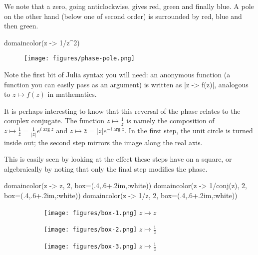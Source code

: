 \documentclass[a4paper]{article}
\begin{document}
We note that a zero, going anticlockwise, gives red, green and finally blue. A
pole on the other hand (below one of second order) is surrounded by red, blue
and then green.

\begin{juliaverbatim}
	domaincolor(z -> 1/z^2)
\end{juliaverbatim}
\begin{figure}[H]
	\centering
	\texttt{[image: figures/phase-pole.png]}
\end{figure}

Note the first bit of Julia syntax you will need: an anonymous function (a
function you can easily pass as an argument) is written as \jlv|z -> f(z)|,
analogous to $z \mapsto f(z)$ in mathematics.

It is perhaps interesting to know that this reversal of the phase relates to the
complex conjugate. The function $z \mapsto \frac{1}{z}$ is namely the
composition of $z \mapsto \frac{1}{\bar{z}} = \frac{1}{|z|} e^{i\arg z}$ and
$z \mapsto \bar{z} = |z| e^{-i\arg z}$. In the first step, the unit circle is
turned inside out; the second step mirrors the image along the real axis.

This is easily seen by looking at the effect these steps have on a square, or
algebraically by noting that only the final step modifies the phase.

\begin{juliaverbatim}
	domaincolor(z -> z, 2, box=(.4,.6+.2im,:white))
	domaincolor(z -> 1/conj(z), 2, box=(.4,.6+.2im,:white))
	domaincolor(z -> 1/z, 2, box=(.4,.6+.2im,:white))
\end{juliaverbatim}
\begin{figure}[H]
	\centering
	\begin{subfigure}{.3\textwidth}
		\centering
		\texttt{[image: figures/box-1.png]}
		$z \mapsto z$
	\end{subfigure}
	\hspace{1ex}
	\begin{subfigure}{.3\textwidth}
		\centering
		\texttt{[image: figures/box-2.png]}
		$z \mapsto \frac{1}{\bar{z}}$
	\end{subfigure}
	\hspace{1ex}
	\begin{subfigure}{.3\textwidth}
		\centering
		\texttt{[image: figures/box-3.png]}
		$z \mapsto \frac{1}{z}$
	\end{subfigure}
\end{figure}
\end{document}
